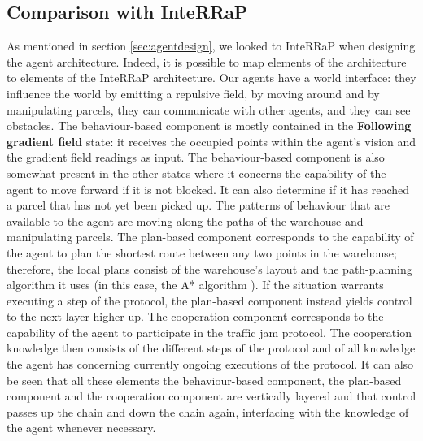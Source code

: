 \subsection{Comparison with InteRRaP}
As mentioned in section \ref{sec:agentdesign}, we looked to InteRRaP \cite{muller2011agent} when designing the agent architecture. Indeed, it is possible to map elements of the architecture to elements of the InteRRaP architecture. Our agents have a world interface: they influence the world by emitting a repulsive field, by moving around and by manipulating parcels, they can communicate with other agents, and they can see obstacles. The behaviour-based component is mostly contained in the \textbf{Following gradient field} state: it receives the occupied points within the agent's vision and the gradient field readings as input. The behaviour-based component is also somewhat present in the other states where it concerns the capability of the agent to move forward if it is not blocked. It can also determine if it has reached a parcel that has not yet been picked up. The patterns of behaviour that are available to the agent are moving along the paths of the warehouse and manipulating parcels. The plan-based component corresponds to the capability of the agent to plan the shortest route between any two points in the warehouse; therefore, the local plans consist of the warehouse's layout and the path-planning algorithm it uses (in this case, the A* algorithm \cite{wiki:astar}). If the situation warrants executing a step of the protocol, the plan-based component instead yields control to the next layer higher up. The cooperation component corresponds to the capability of the agent to participate in the traffic jam protocol. The cooperation knowledge then consists of the different steps of the protocol and of all knowledge the agent has concerning currently ongoing executions of the protocol. It can also be seen that all these elements the behaviour-based component, the plan-based component and the cooperation component are vertically layered and that control passes up the chain and down the chain again, interfacing with the knowledge of the agent whenever necessary.